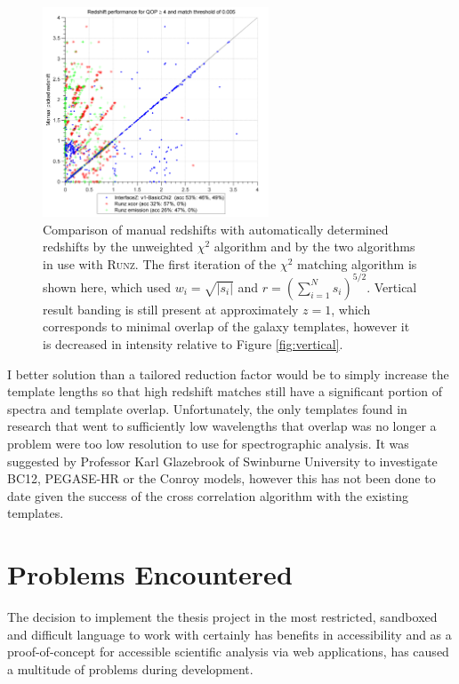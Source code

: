 \documentclass[titlesmallcaps, examinerscopy, copyrightpage]{uqthesis}
\newcommand{\runz}{\textsc{Runz}}
\newcommand{\brac}[1]{\left( #1 \right)}
\newcommand\abs[1]{\left|#1\right|}
\begin{document}
\begin{figure}[ht!]
\includegraphics[width=0.6\textwidth]{images/Fullv1-BasicChi2.png} 
\centering
\caption{Comparison of manual redshifts with automatically determined redshifts by the unweighted $\chi^2$ algorithm and by the two algorithms in use with \runz{}. The first iteration of the $\chi^2$ matching algorithm is shown here, which used $w_i = \sqrt{\abs{s_i}}$ and $r = \brac{\sum_{i=1}^N s_i}^{5/2}$. Vertical result banding is still present at approximately $z=1$, which corresponds to minimal overlap of the galaxy templates, however it is decreased in intensity relative to Figure \ref{fig:vertical}.}
\label{fig:novertical}
\end{figure}

I better solution than a tailored reduction factor would be to simply increase the template lengths so that high redshift matches still have a significant portion of spectra and template overlap. Unfortunately, the only templates found in research that went to sufficiently low wavelengths that overlap was no longer a problem were too low resolution to use for spectrographic analysis. It was suggested by Professor Karl Glazebrook of Swinburne University to investigate BC12, PEGASE-HR or the Conroy models, however this has not been done to date given the success of the cross correlation algorithm with the existing templates.

\pagebreak
\section{Problems Encountered}

The decision to implement the thesis project in the most restricted, sandboxed and difficult language to work with certainly has benefits in accessibility and as a proof-of-concept for accessible scientific analysis via web applications, has caused a multitude of problems during development.
\end{document}
